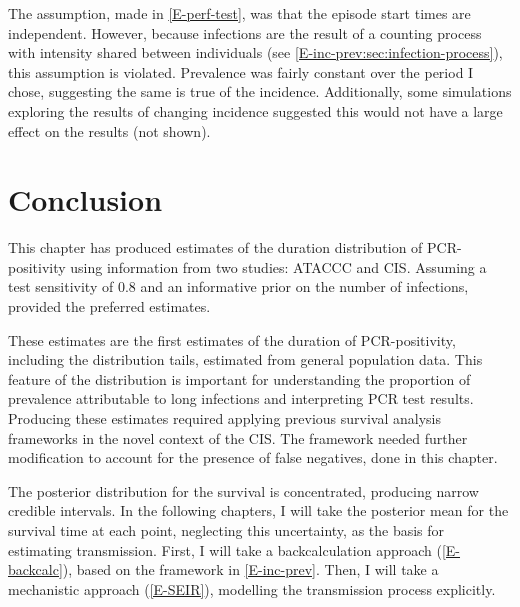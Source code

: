 \documentclass[thesis.tex]{subfiles}
\begin{document}
The assumption, made in \cref{E-perf-test}, was that the episode start times are independent.
However, because infections are the result of a counting process with intensity shared between individuals (see \cref{E-inc-prev:sec:infection-process}), this assumption is violated.
Prevalence was fairly constant over the period I chose, suggesting the same is true of the incidence.
Additionally, some simulations exploring the results of changing incidence suggested this would not have a large effect on the results (not shown).


\section{Conclusion} \label{imperf-test:sec:conclusion}

This chapter has produced estimates of the duration distribution of PCR-positivity using information from two studies: ATACCC and CIS.
Assuming a test sensitivity of 0.8 and an informative prior on the number of infections, provided the preferred estimates.

These estimates are the first estimates of the duration of PCR-positivity, including the distribution tails, estimated from general population data.
This feature of the distribution is important for understanding the proportion of prevalence attributable to long infections and interpreting PCR test results.
Producing these estimates required applying previous survival analysis frameworks in the novel context of the CIS.
The framework needed further modification to account for the presence of false negatives, done in this chapter.

The posterior distribution for the survival is concentrated, producing narrow credible intervals.
In the following chapters, I will take the posterior mean for the survival time at each point, neglecting this uncertainty, as the basis for estimating transmission.
First, I will take a backcalculation approach (\cref{E-backcalc}), based on the framework in \cref{E-inc-prev}.
Then, I will take a mechanistic approach (\cref{E-SEIR}), modelling the transmission process explicitly.

\ifSubfilesClassLoaded{
  \listoftodos
}{}
\end{document}

